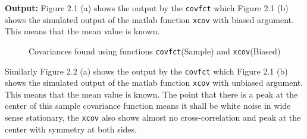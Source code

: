 \noindent \textbf{Output:}
\noindent Figure 2.1 (a) shows the output by the \texttt{covfct} which Figure 2.1 (b) shows the simulated output of the matlab function \texttt{xcov} with biased argument. This means that the mean value is known.
\begin{figure}[H]
    \centering
    \qquad
    \caption{Covariances found using functions \texttt{covfct}(Sample) and \texttt{xcov}(Biased)}
\end{figure}
\noindent Similarly Figure 2.2 (a) shows the output by the \texttt{covfct} which Figure 2.1 (b) shows the simulated output of the matlab function \texttt{xcov} with unbiased argument. This means that the mean value is known. The point that there is a peak at the center of this sample covariance function means it shall be white noise in wide
sense stationary, the \texttt{xcov} also shows almost no cross-correlation and peak at the center with symmetry at both sides.
